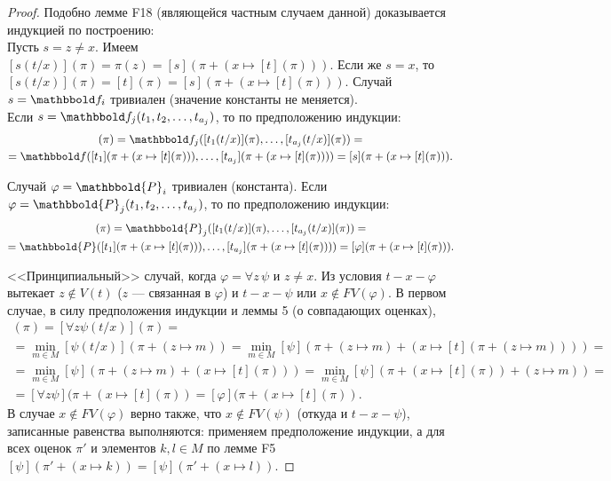 \documentclass[a4paper, fleqn]{article}
\begin{document}
    \begin{proof} Подобно лемме F18 (являющейся частным случаем данной) доказывается индукцией по построению:\\[-10 pt]
    
    Пусть $s = z \ne x$. Имеем $[s(t/x)](\pi) = \pi(z) = [s](\pi + (x \mapsto [t](\pi)))$. Если же $s = x$, то $[s(t/x)](\pi) = [t](\pi) = [s](\pi + (x \mapsto [t](\pi)))$. Случай $s = \F_i$ тривиален (значение константы не меняется).\\[-10 pt]
    
    Если $s = \F_j(t_1, t_2, \ldots, t_{a_j})$, то по предположению индукции:
    \begin{multline*}
    [s(t/x)](\pi) = \F_j([t_1(t/x)](\pi), \ldots, [t_{a_j}(t/x)](\pi)) = \\
    = \F([t_1](\pi + (x \mapsto [t](\pi))), \ldots, [t_{a_j}](\pi + (x \mapsto [t](\pi)))) = [s](\pi + (x \mapsto [t](\pi))).
    \end{multline*}
    
    Случай $\varphi = \mathbbold{P}_i$ тривиален (константа). Если $\varphi = \mathbbold{P}_j(t_1, t_2, \ldots, t_{a_j})$, то по предположению индукции:
    \begin{multline*}
    [\varphi(t/x)](\pi) = \mathbbold{P}_j([t_1(t/x)](\pi), \ldots, [t_{a_j}(t/x)](\pi)) = \\
    = \mathbbold{P}([t_1](\pi + (x \mapsto [t](\pi))), \ldots, [t_{a_j}](\pi + (x \mapsto [t](\pi)))) = [\varphi](\pi + (x \mapsto [t](\pi))).
    \end{multline*}
    
    <<Принципиальный>> случай, когда $\varphi = \forall z\, \psi$ и $z \ne x$. Из условия $t-x-\varphi$ вытекает $z \not\in V(t)$ ($z$ --- связанная в $\varphi$) и $t - x - \psi$ или $x \not\in FV(\varphi)$. В первом случае, в силу предположения индукции и леммы 5 (о совпадающих оценках),
    \begin{multline*}
    [\varphi(t/x)](\pi) = [\forall z \psi(t/x)](\pi) = \\
    = \min\limits_{m \in M}[\psi(t/x)](\pi + (z \mapsto m)) = 
    \min\limits_{m \in M}[\psi](\pi + (z \mapsto m) + (x \mapsto [t](\pi + (z \mapsto m)))) = \\
    = \min\limits_{m \in M}[\psi](\pi + (z \mapsto m) + (x \mapsto [t](\pi))) =
    \min\limits_{m \in M}[\psi](\pi + (x \mapsto [t](\pi)) + (z \mapsto m)) = \\
     = [\forall z \psi](\pi + (x \mapsto [t](\pi)) = [\varphi](\pi + (x \mapsto [t](\pi)).
    \end{multline*}
    В случае $x \not\in FV(\varphi)$ верно также, что $x \not\in FV(\psi)$ (откуда и $t-x-\psi$), записанные равенства выполняются: применяем предположение индукции, а для всех оценок $\pi'$ и элементов $k, l \!\in\! M$ по лемме F5 $[\psi](\pi' + (x \mapsto k)) = [\psi](\pi' + (x \mapsto l))$.
    \end{proof}
\end{document}
